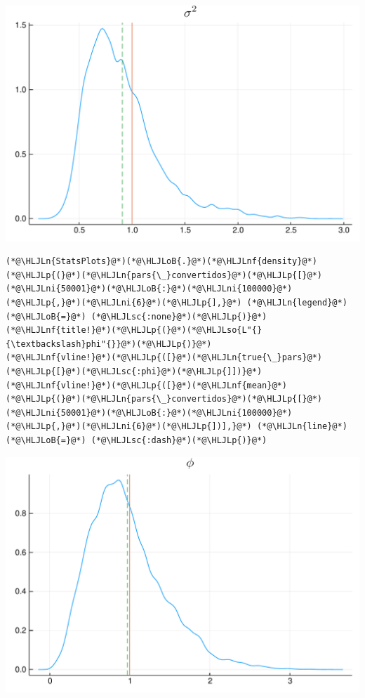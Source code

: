 \documentclass[12pt,a4paper]{article}
\newcommand{\HLJLn}[1]{#1}
\newcommand{\HLJLnf}[1]{\textcolor[RGB]{66,102,213}{#1}}
\newcommand{\HLJLsc}[1]{\textcolor[RGB]{201,61,57}{#1}}
\newcommand{\HLJLso}[1]{\textcolor[RGB]{201,61,57}{#1}}
\newcommand{\HLJLni}[1]{\textcolor[RGB]{59,151,46}{#1}}
\newcommand{\HLJLoB}[1]{\textcolor[RGB]{102,102,102}{\textbf{#1}}}
\newcommand{\HLJLp}[1]{#1}
\begin{document}
\includegraphics[width=\linewidth]{figures/dsge_and_julia_29_1.pdf}

\begin{lstlisting}
(*@\HLJLn{StatsPlots}@*)(*@\HLJLoB{.}@*)(*@\HLJLnf{density}@*)(*@\HLJLp{(}@*)(*@\HLJLn{pars{\_}convertidos}@*)(*@\HLJLp{[}@*)(*@\HLJLni{50001}@*)(*@\HLJLoB{:}@*)(*@\HLJLni{100000}@*)(*@\HLJLp{,}@*)(*@\HLJLni{6}@*)(*@\HLJLp{],}@*) (*@\HLJLn{legend}@*) (*@\HLJLoB{=}@*) (*@\HLJLsc{:none}@*)(*@\HLJLp{)}@*)
(*@\HLJLnf{title!}@*)(*@\HLJLp{(}@*)(*@\HLJLso{L"{}{\textbackslash}phi"{}}@*)(*@\HLJLp{)}@*)
(*@\HLJLnf{vline!}@*)(*@\HLJLp{([}@*)(*@\HLJLn{true{\_}pars}@*)(*@\HLJLp{[}@*)(*@\HLJLsc{:phi}@*)(*@\HLJLp{]])}@*)
(*@\HLJLnf{vline!}@*)(*@\HLJLp{([}@*)(*@\HLJLnf{mean}@*)(*@\HLJLp{(}@*)(*@\HLJLn{pars{\_}convertidos}@*)(*@\HLJLp{[}@*)(*@\HLJLni{50001}@*)(*@\HLJLoB{:}@*)(*@\HLJLni{100000}@*)(*@\HLJLp{,}@*)(*@\HLJLni{6}@*)(*@\HLJLp{])],}@*) (*@\HLJLn{line}@*) (*@\HLJLoB{=}@*) (*@\HLJLsc{:dash}@*)(*@\HLJLp{)}@*)
\end{lstlisting}

\includegraphics[width=\linewidth]{figures/dsge_and_julia_30_1.pdf}
\end{document}
